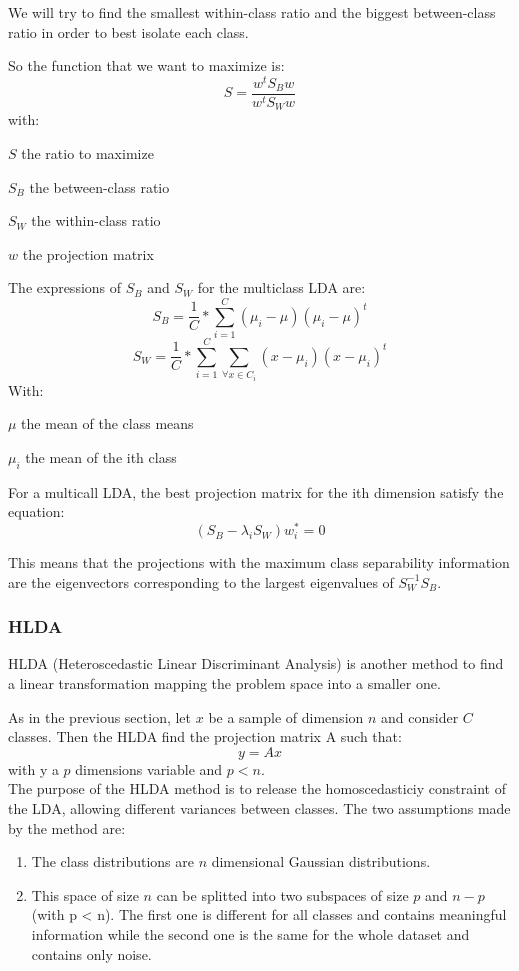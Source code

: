 We will try to find the smallest within-class ratio and the biggest between-class ratio in order to best isolate each class.

So the function that we want to maximize is:
$$S = \frac{w^t S_B w}{w^t S_W w}$$
with:
\begin{itemize*}
  \item $S$ the ratio to maximize
  \item $S_B$ the between-class ratio
  \item $S_W$ the within-class ratio
  \item $w$ the projection matrix
\end{itemize*}

The expressions of $S_B$ and $S_W$ for the multiclass LDA are:
$$S_B = \frac{1}{C} * \sum\limits_{i = 1}^C (\mu_i - \mu)(\mu_i - \mu)^t$$
$$S_W = \frac{1}{C} * \sum\limits_{i = 1}^C \sum\limits_{\forall x \in C_i} (x - \mu_i)(x - \mu_i)^t$$
With:
\begin{itemize*}
  \item $\mu$ the mean of the class means
  \item $\mu_i$ the mean of the ith class
\end{itemize*}

For a multicall LDA, the best projection matrix for the ith dimension satisfy the equation:
$$(S_B - \lambda_i S_W)w_{i}^* = 0$$

This means that the projections with the maximum class separability information are the eigenvectors corresponding to the largest eigenvalues of $S_{W}^{-1} S_B$.

\subsubsection{HLDA}

HLDA (Heteroscedastic Linear Discriminant Analysis) is another method to find a linear transformation mapping the problem space into a smaller one.

As in the previous section, let $x$ be a sample of dimension $n$ and consider $C$ classes. Then the HLDA find the projection matrix A such that:
$$y = Ax$$
with y a $p$ dimensions variable and $p < n$.\\

The purpose of the HLDA method is to release the homoscedasticiy constraint of the LDA, allowing different variances between classes. The two assumptions made by the method are:

\begin{enumerate}
  \item The class distributions are $n$ dimensional Gaussian distributions.
  \item This space of size $n$ can be splitted into two subspaces of size $p$
    and $n - p$ (with p < n). The first one is different for all classes and contains meaningful information while the second one is the same for the whole dataset and contains only noise.
\end{enumerate}

